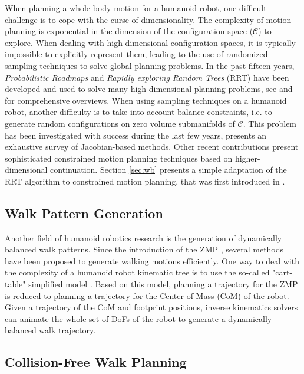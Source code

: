 \documentclass{article}
\begin{document}
When  planning a  whole-body motion  for a  humanoid robot, one difficult
challenge is to cope with  the curse of dimensionality. The complexity
of   motion  planning  is   exponential  in   the  dimension   of  the
configuration  space ($\mathcal{C}$)  to explore.  When  dealing with
high-dimensional configuration  spaces, it is  typically impossible to
explicitly represent  them, leading to the use  of randomized sampling
techniques  to solve  global planning  problems. In  the  past fifteen
years,  \textit{Probabilistic Roadmaps} \cite{kavraki1996prp} and  
\textit{Rapidly exploring Random  Trees} (RRT) 
\cite{kuffner00rrtconnect}  have been  developed and  used to  solve many
high-dimensional   planning  problems, see \cite{Lav06} and \cite{choset2005prm} for comprehensive
overviews.
When  using  sampling  techniques  on  a humanoid  robot,  another difficulty
is to  take into  account balance  constraints,  i.e. to
generate  random  configurations   on  zero  volume  submanifolds  of
$\mathcal{C}$. This problem has been investigated with success during
the last few years, \cite{Berenson15032011} presents an exhaustive survey
of Jacobian-based methods. Other recent contributions \cite{porta2012randomized}
present sophisticated constrained motion planning techniques based on higher-dimensional
continuation. Section \ref{sec:wb} presents a simple adaptation
of the RRT algorithm to constrained motion planning, that was first
introduced in \cite{dalibard09}.

\subsection{Walk Pattern Generation}

Another field of humanoid robotics research is the generation of
dynamically balanced walk patterns. Since the introduction of the ZMP
\cite{vukobratovic1969contribution}, several methods have been
proposed to generate walking motions efficiently.  One way to deal
with the complexity of a humanoid robot kinematic tree is to use the
so-called "cart-table" simplified model \cite{kajita2003biped}. Based
on this model, planning a trajectory for the ZMP is reduced to
planning a trajectory for the Center of Mass (CoM) of the robot.
Given a trajectory of the CoM and footprint positions, inverse
kinematics solvers can animate the whole set of DoFs of the robot to
generate a dynamically balanced walk trajectory.


\subsection{Collision-Free Walk Planning}
\end{document}
